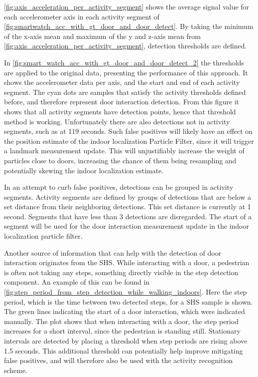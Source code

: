 \cref{fig:axis_acceleration_per_activity_segment} shows the average signal value for each accelerometer axis in each activity segment of \cref{fig:smartwatch_acc_with_gt_door_and_door_detect}. By taking the minimum of the x-axis mean and maximum of the y and z-axis mean from \cref{fig:axis_acceleration_per_activity_segment}, detection thresholds are defined.

In \cref{fig:smart_watch_acc_with_gt_door_and_door_detect_2} the thresholds are applied to the original data, presenting the performance of this approach. It shows the accelerometer data per axis, and the start and end of each activity segment. The cyan dots are samples that satisfy the activity thresholds defined before, and therefore represent door interaction detection. From this figure it shows that all activity segments have detection points, hence that threshold method is working. Unfortunately there are also detections not in activity segments, such as at 119 seconds. Such false positives will likely have an effect on the position estimate of the indoor localization Particle Filter, since it will trigger a landmark measurement update. This will unjustifiably increase the weight of particles close to doors, increasing the chance of them being resampling and potentially skewing the indoor localization estimate.  \par 

In an attempt to curb false positives, detections can be grouped in activity segments. Activity segments are defined by groups of detections that are below a set distance from their neighboring detections. This set distance is currently at 1 second. Segments that have less than 3 detections are disregarded. The start of a segment will be used for the door interaction measurement update in the indoor localization particle filter.\par

Another source of information that can help with the detection of door interaction originates from the \ac{SHS}. While interacting with a door, a pedestrian is often not taking any steps, something directly visible in the step detection component. An example of this can be found in \cref{fig:step_period_from_step_detection_while_walking_indoors}. Here the step period, which is the time between two detected steps, for a \ac{SHS} sample is shown. The green lines indicating the start of a door interaction, which were indicated manually. The plot shows that when interacting with a door, the step period increases for a short interval, since the pedestrian is standing still. Stationary intervals are detected by placing a threshold when step periods are rising above 1.5 seconds. This additional threshold can potentially help improve mitigating false positives, and will therefore also be used with the activity recognition scheme.

